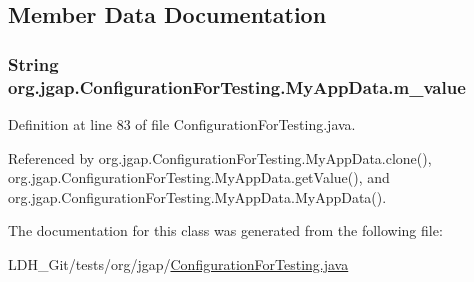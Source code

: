 \subsection{Member Data Documentation}
\hypertarget{classorg_1_1jgap_1_1_configuration_for_testing_1_1_my_app_data_a5b78324e0e7bcb2b3620ee165fe43c83}{
\subsubsection[{m\-\_\-value}]{\setlength{\rightskip}{0pt plus 5cm}String org.\-jgap.\-Configuration\-For\-Testing.\-My\-App\-Data.\-m\-\_\-value\hspace{0.3cm}{\ttfamily [private]}}}\label{classorg_1_1jgap_1_1_configuration_for_testing_1_1_my_app_data_a5b78324e0e7bcb2b3620ee165fe43c83}


Definition at line 83 of file Configuration\-For\-Testing.\-java.



Referenced by org.\-jgap.\-Configuration\-For\-Testing.\-My\-App\-Data.\-clone(), org.\-jgap.\-Configuration\-For\-Testing.\-My\-App\-Data.\-get\-Value(), and org.\-jgap.\-Configuration\-For\-Testing.\-My\-App\-Data.\-My\-App\-Data().



The documentation for this class was generated from the following file\-:\begin{DoxyCompactItemize}
\item 
L\-D\-H\-\_\-\-Git/tests/org/jgap/\hyperlink{_configuration_for_testing_8java}{Configuration\-For\-Testing.\-java}\end{DoxyCompactItemize}
